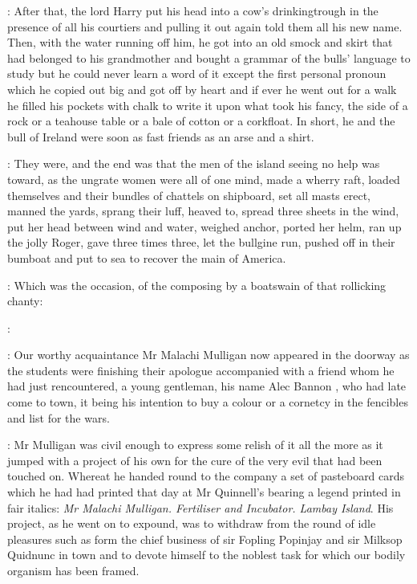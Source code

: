 \documentclass[12pt]{article}
\begin{document}
\Ly: After that, the lord Harry put his head into a cow's drinkingtrough
in the presence of all his courtiers and pulling it out again told them
all his new name. Then, with the water running off him, he got into an old
smock and skirt that had belonged to his grandmother and bought a grammar
of the bulls' language to study but he could never learn a word of it
except the first personal pronoun which he copied out big and got off by
heart and if ever he went out for a walk he filled his pockets with chalk
to write it upon what took his fancy, the side of a rock or a teahouse
table or a bale of cotton or a corkfloat. In short, he and the bull of
Ireland were soon as fast friends as an arse and a shirt.

\SD: They were, and the end was that the men of the island seeing no help
was toward, as the ungrate women were all of one mind, made a wherry raft,
loaded themselves and their bundles of chattels on shipboard, set all
masts erect, manned the yards, sprang their luff, heaved to, spread three
sheets in the wind, put her head between wind and water, weighed anchor,
ported her helm, ran up the jolly Roger, gave three times three, let the
bullgine run, pushed off in their bumboat and put to sea to recover the
main of America.

\Ly: Which was the occasion, of the composing by a boatswain of that
rollicking chanty:

\Ly: 




: Our worthy acquaintance Mr Malachi Mulligan  now appeared
in the doorway as the students were finishing their apologue accompanied
with a friend whom he had just rencountered, a young gentleman, his name
Alec Bannon , who had late come to town, it being his
intention to buy a colour or a cornetcy in the fencibles and list for the
wars.

: Mr Mulligan was civil enough to express some relish of it all the
more as it jumped with a project of his own for the cure of the very evil
that had been touched on. Whereat he handed round to the company a set of
pasteboard cards which he had had printed that day at Mr Quinnell's
bearing a legend printed in fair italics:
\emph{Mr Malachi Mulligan. Fertiliser and Incubator. Lambay Island}.
His project, as he went on to expound, was to withdraw from the round of
idle pleasures such as form the chief business of sir Fopling Popinjay and
sir Milksop Quidnunc in town and to devote himself to the noblest task for
which our bodily organism has been framed.
\end{document}
